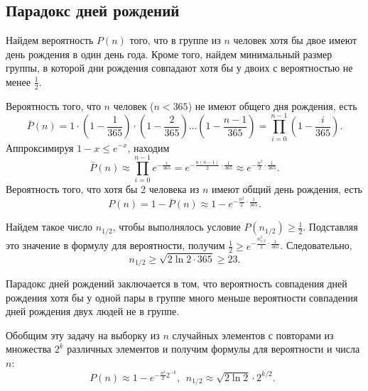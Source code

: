 \subsection{Парадокс дней рождений}

Найдем вероятность $P(n)$ того, что в группе из $n$ человек хотя бы двое имеют день рождения в один день года. Кроме того, найдем минимальный размер группы, в которой дни рождения совпадают хотя бы у двоих с вероятностью не менее $\frac{1}{2}$.

Вероятность того, что $n$ человек ($n < 365$) не имеют общего дня рождения, есть
\[
    \bar{P}(n) = 1 \cdot \left( 1 - \frac{1}{365} \right) \cdot \left(1 - \frac{2}{365} \right)  \dots  \left( 1 - \frac{n-1}{365} \right) = \prod\limits_{i=0}^{n-1} \left( 1 - \frac{i}{365} \right).
\]
Аппроксимируя $1-x \leq e^{-x}$, находим
    \[ \bar{P}(n) \approx \prod\limits_{i=0}^{n-1} e^{-\frac{i}{365}} = e^{-\frac{n(n-1)}{2} \cdot \frac{1}{365}} \approx e^{-\frac{n^2}{2} \cdot \frac{1}{365}}. \]
Вероятность того, что хотя бы 2 человека из $n$ имеют общий день рождения, есть
    \[ P(n) = 1 - \bar{P}(n) \approx 1 -  e^{-\frac{n^2}{2} \cdot \frac{1}{365}}. \]

Найдем такое число $n_{1/2}$, чтобы выполнялось условие $P(n_{1/2}) \geq \frac{1}{2}$. Подставляя это значение в формулу для вероятности,  получим $\frac{1}{2} \geq e^{-\frac{n_{1/2}^2}{2} \cdot \frac{1}{365}}$. Следовательно,
\[
    n_{1/2} \geq \sqrt{2 \ln 2 \cdot 365} \geq 23.
\]

Парадокс дней рождений заключается в том, что вероятность совпадения дней рождения хотя бы у одной пары в группе много меньше вероятности совпадения дней рождения двух людей не в группе.


Обобщим эту задачу на выборку из $n$ случайных элементов с повторами из множества  $2^k$ различных элементов и получим формулы для вероятности и числа $n$:
\[
    P(n) \approx 1 -  e^{-\frac{n^2}{2} 2^{-k}}, ~~
    n_{1/2} \approx \sqrt{2 \ln 2} \cdot 2^{k/2}. ~~
\]

